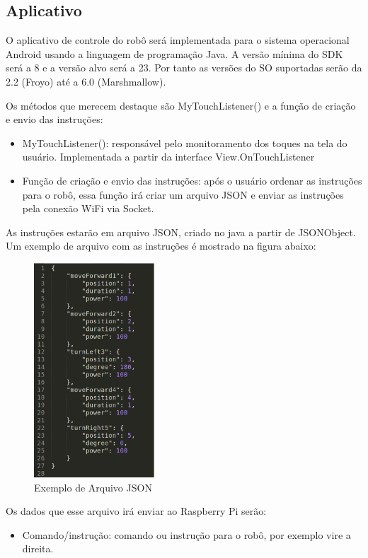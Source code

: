 \subsection{Aplicativo}
O aplicativo de controle do robô será implementada para o sistema operacional Android usando a linguagem de programação Java. A versão mínima do SDK será a 8 e a versão alvo será a 23. Por tanto as versões do SO suportadas serão da 2.2 (Froyo) até a 6.0 (Marshmallow).

Os métodos que merecem destaque são MyTouchListener() e a função de criação e envio das instruções:
\begin{itemize}
\item MyTouchListener(): responsável pelo monitoramento dos toques na tela do usuário. Implementada a partir da interface View.OnTouchListener
\item Função de criação e envio das instruções: após o usuário ordenar as instruções para o robô, essa função irá criar um arquivo JSON e enviar as instruções pela conexão WiFi via Socket.
\end{itemize}

As instruções estarão em arquivo JSON, criado no java a partir de JSONObject. Um exemplo de arquivo com as instruções é mostrado na figura abaixo:

\begin{figure}[H]
    \centering
    \includegraphics[width=0.4\textwidth]{figuras/exemplo_json.eps}
    \caption{Exemplo de Arquivo JSON}
    \label{fig:catia01}
\end{figure}

Os dados que esse arquivo irá enviar ao Raspberry Pi serão:
\begin{itemize}
	\item Comando/instrução: comando ou instrução para o robô, por exemplo vire a direita.
\end{itemize}

